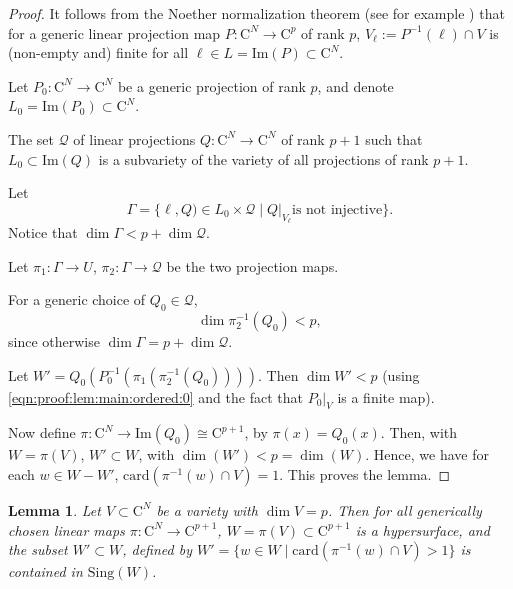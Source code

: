 \documentclass[10pt]{amsart}
\newtheorem{lemma}{Lemma}[section]
\theoremstyle{definition}
\theoremstyle{remark}
\numberwithin{equation}{section}
\newcommand {\C}     {\mathrm{C}}
\newcommand{\card}{\mathrm{card}}
\newcommand{\Sing}{\mathrm{Sing}}
\begin{document}
\begin{proof}
It follows from the
Noether normalization theorem
(see for example \cite[Theorem 2.2.9]{deJong-Pfister-book})
that for a generic linear projection map $P:\C^{N} \rightarrow \C^p$
of rank $p$,
$V_\ell := P^{-1}(\ell) \cap V$ is (non-empty and) finite for all $\ell \in L = \mathrm{Im}(P) \subset \C^N$.

Let $P_0: \C^N \rightarrow \C^N$ be a generic projection of rank $p$, and
denote $L_0 = \mathrm{Im}(P_0) \subset \C^N$.

The set $\mathcal{Q}$ of 
linear projections $Q:\C^N \rightarrow \C^N$ of rank $p+1$ such
that $L_0 \subset \mathrm{Im}(Q) $
is a subvariety of the variety of all projections of rank $p+1$.

Let
\[
\Gamma = \{\ell,Q) \in L_0 \times \mathcal{Q} 
\mid Q|_{V_\ell} \text{is not injective}\}.
\]
Notice that $\dim \Gamma < p + \dim \mathcal{Q}$. 


Let $\pi_1: \Gamma \rightarrow U$, $\pi_2: \Gamma \rightarrow \mathcal{Q}$ be the two projection maps.

For a generic choice of $Q_0 \in \mathcal{Q}$, 
\begin{equation}
\label{eqn:proof:lem:main:ordered:0}
\dim \pi_2^{-1}(Q_0) < p,
\end{equation}
since otherwise
$\dim \Gamma = p + \dim \mathcal{Q}$.

Let $W' = Q_0(P_0^{-1}(\pi_1(\pi_2^{-1}(Q_0))))$.
Then $\dim W' < p$ (using \eqref{eqn:proof:lem:main:ordered:0} and the fact that $P_0|_V$ is a finite map).

Now define $\pi: \C^{N} \rightarrow \mathrm{Im}(Q_0) \cong \C^{p+1}$, by
$\pi(x) = Q_0(x)$. Then, with $W = \pi(V)$, 
$W' \subset W$, with $\dim(W') < p = \dim(W)$.
Hence, we have for each $w \in W - W'$,
$\card(\pi^{-1}(w) \cap V) = 1$. This proves the lemma.
\end{proof}

\begin{lemma}
\label{lem:main:ordered:1}
    Let $V \subset \C^N$ be a variety with $\dim V = p$.
    Then for all generically chosen linear maps $\pi:\C^N \rightarrow \C^{p+1}$,
    $W = \pi(V) \subset \C^{p+1}$ is a hypersurface, and the subset $W' \subset W$, defined by 
    $W' = \{w \in W  \mid \card(\pi^{-1}(w) \cap V) > 1\}$ is contained
    in $\Sing(W)$.
\end{lemma}
\end{document}
